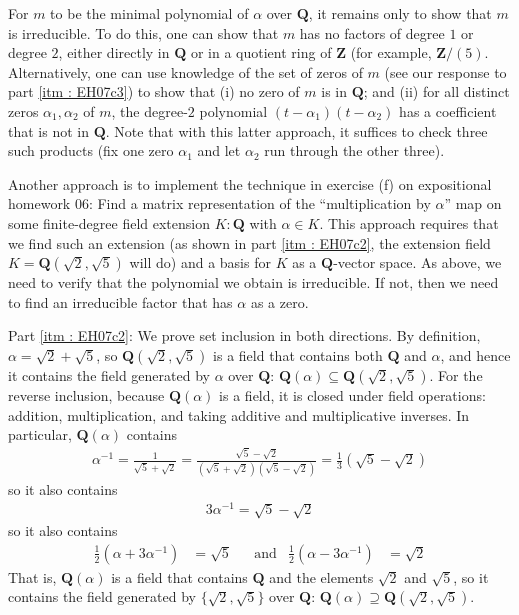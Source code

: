 \documentclass[oneside, english, 11pt]{article}
\newcommand{\fontField}[1]{\mathbf{#1}}
\newcommand{\integers}{\fontField{Z}}
\newcommand{\Q}{\rationals}
\newcommand{\rationals}{\fontField{Q}}
\newcommand{\Z}{\integers}
\begin{document}
For $m$ to be the minimal polynomial of $\alpha$ over $\Q$, it remains only to show that $m$ is irreducible. To do this, one can show that $m$ has no factors of degree $1$ or degree $2$, either directly in $\Q$ or in a quotient ring of $\Z$ (for example, $\Z / (5)$. Alternatively, one can use knowledge of the set of zeros of $m$ (see our response to part \ref{itm : EH07c3}) to show that (i) no zero of $m$ is in $\Q$; and (ii) for all distinct zeros $\alpha_{1}, \alpha_{2}$ of $m$, the degree-$2$ polynomial $(t - \alpha_{1}) (t - \alpha_{2})$ has a coefficient that is not in $\Q$. Note that with this latter approach, it suffices to check three such products (fix one zero $\alpha_{1}$ and let $\alpha_{2}$ run through the other three).

Another approach is to implement the technique in exercise (f) on expositional homework 06: Find a matrix representation of the ``multiplication by $\alpha$'' map on some finite-degree field extension $K : \Q$ with $\alpha \in K$. This approach requires that we find such an extension (as shown in part \ref{itm : EH07c2}, the extension field $K = \Q(\sqrt{2}, \sqrt{5})$ will do) and a basis for $K$ as a $\Q$-vector space. As above, we need to verify that the polynomial we obtain is irreducible. If not, then we need to find an irreducible factor that has $\alpha$ as a zero.

Part \ref{itm : EH07c2}: We prove set inclusion in both directions. By definition, $\alpha = \sqrt{2} + \sqrt{5}$, so $\Q(\sqrt{2}, \sqrt{5})$ is a field that contains both $\Q$ and $\alpha$, and hence it contains the field generated by $\alpha$ over $\Q$: $\Q(\alpha) \subseteq \Q(\sqrt{2}, \sqrt{5})$. For the reverse inclusion, because $\Q(\alpha)$ is a field, it is closed under field operations: addition, multiplication, and taking additive and multiplicative inverses. In particular, $\Q(\alpha)$ contains
\begin{align*}
\alpha^{-1}
=
\frac{1}{\sqrt{5} + \sqrt{2}}
=
\frac{\sqrt{5} - \sqrt{2}}{(\sqrt{5} + \sqrt{2}) (\sqrt{5} - \sqrt{2})}
=
\frac{1}{3} (\sqrt{5} - \sqrt{2})
\end{align*}
so it also contains
\begin{align*}
3 \alpha^{-1}
=
\sqrt{5} - \sqrt{2}
\end{align*}
so it also contains
\begin{align*}
\frac{1}{2} (\alpha + 3 \alpha^{-1})
&=
\sqrt{5}
&
&\text{and}
&
\frac{1}{2} (\alpha - 3 \alpha^{-1})
&=
\sqrt{2}
\end{align*}
That is, $\Q(\alpha)$ is a field that contains $\Q$ and the elements $\sqrt{2}$ and $\sqrt{5}$, so it contains the field generated by $\{\sqrt{2}, \sqrt{5}\}$ over $\Q$: $\Q(\alpha) \supseteq \Q(\sqrt{2}, \sqrt{5})$.
\end{document}
